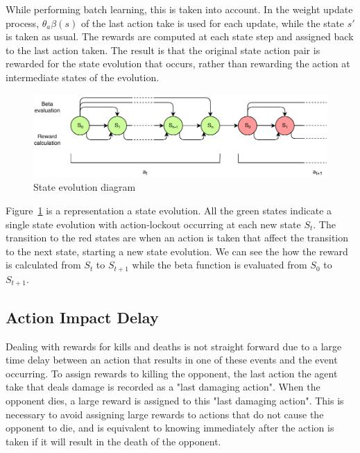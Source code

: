While performing batch learning, this is taken into account. In the weight update process, $\theta_a\beta(s)$ of the last action take is used for each update, while the state $s'$ is taken as usual. The rewards are computed at each state step and assigned back to the last action taken. The result is that the original state action pair is rewarded for the state evolution that occurs, rather than rewarding the action at intermediate states of the evolution. 

\begin{figure}[!htb]
	\centering
	\includegraphics[width=120mm]{stateevolution.pdf}
	\caption{State evolution diagram}
	\label{fig:stateevo}
\end{figure}

Figure~\ref{fig:stateevo} is a representation a state evolution. All the green states indicate a single state evolution with action-lockout occurring at each new state $S_{t}$. The transition to the red states are when an action is taken that affect the transition to the next state, starting a new state evolution. We can see the how the reward is calculated from $S_{t}$ to $S_{t+1}$ while the beta function is evaluated from $S_{0}$ to $S_{t+1}$.

\subsection{Action Impact Delay}

Dealing with rewards for kills and deaths is not straight forward due to a large time delay between an action that results in one of these events and the event occurring. To assign rewards to killing the opponent, the last action the agent take that deals damage is recorded as a "last damaging action". When the opponent dies, a large reward is assigned to this "last damaging action". This is necessary to avoid assigning large rewards to actions that do not cause the opponent to die, and is equivalent to knowing immediately after the action is taken if it will result in the death of the opponent.





